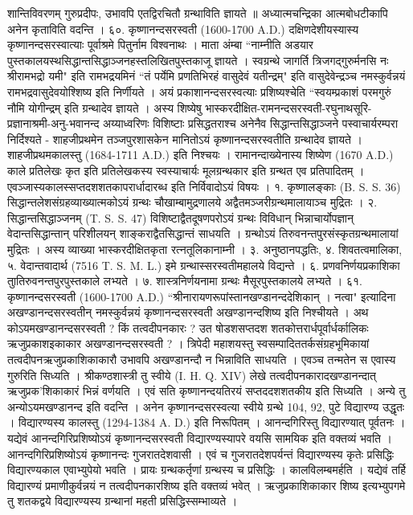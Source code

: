शान्तिविवरणम् गुरुप्रदीपः, उभावपि एतद्विरचितौ ग्रन्थाविति ज्ञायते ॥ अध्यात्मचन्द्रिका आत्मबोधटीकापि अनेन कृताविति वदन्ति ।
६०. कृष्णानन्दसरस्वती (1600-1700 A.D.)
दक्षिणदेशीयस्यास्य कृष्णानन्दसरस्वात्याः पूर्वाश्रमे पितुर्नाम विश्वनाथः । माता अंम्बा ``नाम्नीति अडयार पुस्तकालयस्थसिद्धान्तसिद्धाञ्जनहस्तलिखितपुस्तकाजू ज्ञायते । स्वग्रन्थे जागर्ति त्रिजगद्गुरुर्मनसि नः श्रीरामभद्रो यमी" इति रामभद्रयमिनं ``तं पर्येमि प्रणतिभिरहं वासुदेवं यतीन्द्रम्" इति वासुदेवेन्द्रञ्च नमस्कुर्वन्नयं रामभद्रवासुदेवयोश्शिष्य इति निर्णीयते । अयं प्रकाशानन्दसरस्वत्याः प्रशिष्यश्चेति ``स्वयम्प्रकाशं परमगुरुं नौमि योगीन्द्रम् इति ग्रन्थादेव ज्ञायते । अस्य शिष्येषु भास्करदीक्षित-रामनन्दसरस्वती-रघुनाथसूरि-प्रज्ञानाश्रमी-अनु-भवानन्द अय्याध्वरिणः विशिष्टाः प्रसिद्धतराश्च अनेनैव सिद्धान्तसिद्धाञ्जने पस्वाचार्यरम्परा निर्दिश्यते -
शाहजीप्रथमेन तञ्जपुरशासकेन मानितोऽयं कृष्णानन्दसरस्वतीति ग्रन्थादेव ज्ञायते । शाहजीप्रथमकालस्तु (1684-1711 A.D.) इति निश्चयः । रामानन्दाख्येनास्य शिष्येण (1670 A.D.) काले प्रतिलेखः कृत इति प्रतिलेखकस्य स्वस्याचार्यः मूलग्रन्थकार इति ग्रन्थत एव प्रतिपादितम् । एवञ्जास्यकालस्सप्तदशशतकापरार्धादारब्ध इति निर्विवादोऽयं विषयः ।
१. कृष्णालङ्काः (B. S. S. 36)
सिद्धान्तलेशसंग्रहव्याख्यात्मकोऽयं ग्रन्थः चौखाम्बामुद्रणालये अद्वैतमञ्जरीग्रन्थमालायाञ्च मुद्रितः ।
२. सिद्धान्तसिद्धाञ्जनम् (T. S. S. 47)
विशिष्टाद्वैतदूषणपरोऽयं ग्रन्थः विविधान् भिन्नाचार्योपज्ञान् वेदान्तसिद्धान्तान् परिशीलयन् शाङ्कराद्वैतसिद्धान्तं साधयति । ग्रन्थोऽयं तिरुवनन्तपुरसंस्कृतग्रन्थमालायां मुद्रितः । अस्य व्याख्या भास्करदीक्षितकृता रत्नतूलिकानाम्नी ।
३. अनुष्ठानपद्धतिः, ४. शिवतत्वमालिका, ५. वेदान्तवादार्थ (7516 T. S. M. L.) इमे ग्रन्थास्सरस्वतीमहालये विद्यन्ते । ६. प्रणवनिर्णयप्रकाशिका तुातिरुवनन्तपुरपुस्तकाले लभ्यते । ७. शास्त्रनिर्णयनामा ग्रन्थः मैसूरपुस्तकालये लभ्यते ।
६१. कृष्णानन्दसरस्वती (1600-1700 A.D.)
``श्रीनारायणरूपांस्तानखण्डानन्ददेशिकान् । नत्वा" इत्यादिना अखण्डानन्दसरस्वतीन् नमस्कुर्वन्नयं कृष्णानन्दसरस्वती अखण्डानन्दशिष्य इति निश्चीयते ।
अथ कोऽयमखण्डानन्दसरस्वती ? किं तत्वदीपनकारः ? उत षोडशसप्तदश शतकोत्तरार्धपूर्वार्धर्कालिकः ऋजुप्रकाशइकाकार अखण्डानन्दसरस्वती ? । त्रिपेदी महाशयस्तु स्वसम्पादिततर्कसंग्रहभूमिकायां तत्वदीपनऋजुप्रकाशिकाकारौ उभावपि अखण्डानन्दौ न भिन्नाविति साधयति । एवञ्च तन्मतेन स एवास्य गुरुरिति सिध्यति । श्रीकण्ठशास्त्री तु स्वीये (I. H. Q. XIV) लेखे तत्वदीपनकारादखण्डानन्दात् ऋजुप्रक'शिकाकारं भिन्नं वर्णयति । एवं सति कृष्णानन्दयतिरयं सप्तददशशतकीय इति सिध्यति । अन्ये तु अन्योऽयमखण्डानन्द इति वदन्ति ।
अनेन कृष्णानन्दसरस्वत्या स्वीये ग्रन्थे 104, 92, पुटे विद्यारण्य उद्धृतः । विद्यारण्यस्य कालस्तु (1294-1384 A. D.) इति निरूपितम् । आनन्दगिरिस्तु विद्यारण्यात् पूर्वतनः । यद्येवं आनन्दगिरिप्रशिष्योऽयं कृष्णानन्दसरस्वती विद्यारण्यस्यापरे वयसि सामयिक इति वक्तव्यं भवति । आनन्दगिरिप्रशिष्योऽयं कृष्णानन्दः गुजरातदेशवासी । एवं च गुजरातदेशपर्यन्तं विद्यारण्यस्य कृतेः प्रसिद्धिः विद्यारण्यकाल एवाभ्युपेयो भवति । प्रायः ग्रन्थकर्तृणां ग्रन्थस्य च प्रसिद्धिः । कालविलम्बमर्हति । यद्येवं तर्हि विद्यारण्यं प्रमाणीकुर्वन्नयं न तत्वदीपनकारशिष्य इति वक्तव्यं भवेत् । ऋजुप्रकाशिकाकार शिष्य इत्यभ्युपगमे तु शतकद्वये विद्यारण्यस्य ग्रन्थानां महती प्रसिद्धिस्सम्भाव्यते ।
